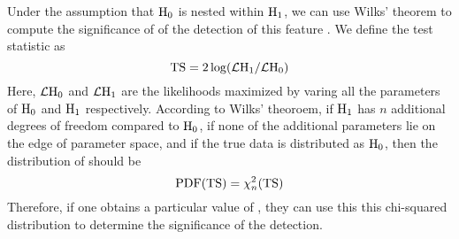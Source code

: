 Under the assumption that $\text{H}_0$ is nested within $\text{H}_1$,
we can use Wilks' theorem to compute the significance of
of the detection of this feature \citep{wilks_1938a_large-sample-distribution}.
We define the test statistic as
\begin{equation}
  \mathrm{TS} = 2\log(\mathcal{L}\text{H}_1/\mathcal{L}\text{H}_0)
\end{equation}
Here, $\mathcal{L}\text{H}_0$ and $\mathcal{L}\text{H}_1$ are
the likelihoods maximized by varing
all the parameters of $\text{H}_0$ and $\text{H}_1$ respectively.
According to Wilks' theoroem, if $\text{H}_1$ has $n$ additional
degrees of freedom compared to $\text{H}_0$, if none of the additional
parameters lie on the edge of parameter space, and if the true data is
distributed as $\text{H}_0$, then the distribution of \ts should be
\begin{equation}
  \text{PDF}(\mathrm{TS}) = \chi^2_n(\mathrm{TS})
\end{equation}
Therefore, if one obtains a particular value of \ts, they can use
this this chi-squared distribution to determine the significance of
the detection.
